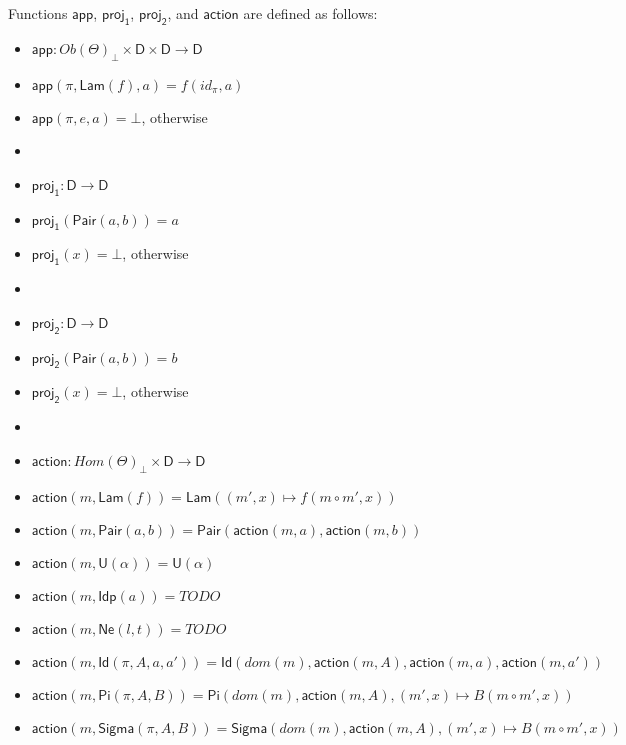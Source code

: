 \documentclass{amsart}
\theoremstyle{definition}
\theoremstyle{remark}
\newcommand{\D}{\mathsf{D}}
\numberwithin{table}{section}
\begin{document}
Functions $\mathsf{app}$, $\mathsf{proj_1}$, $\mathsf{proj_2}$, and $\mathsf{action}$ are defined as follows:
\begin{itemize}
\item[] $\mathsf{app} : Ob(\Theta)_\bot \times \D \times \D \to \D$
\item[] $\mathsf{app}(\pi,\mathsf{Lam}(f),a) = f(id_\pi,a)$
\item[] $\mathsf{app}(\pi,e,a) = \bot$, otherwise
\item[]
\item[] $\mathsf{proj_1} : \D \to \D$
\item[] $\mathsf{proj_1}(\mathsf{Pair}(a,b)) = a$
\item[] $\mathsf{proj_1}(x) = \bot$, otherwise
\item[]
\item[] $\mathsf{proj_2} : \D \to \D$
\item[] $\mathsf{proj_2}(\mathsf{Pair}(a,b)) = b$
\item[] $\mathsf{proj_2}(x) = \bot$, otherwise
\item[]
\item[] $\mathsf{action} : Hom(\Theta)_\bot \times \D \to \D$
\item[] $\mathsf{action}(m, \mathsf{Lam}(f)) = \mathsf{Lam}((m',x) \mapsto f(m \circ m', x))$
\item[] $\mathsf{action}(m, \mathsf{Pair}(a, b)) = \mathsf{Pair}(\mathsf{action}(m, a), \mathsf{action}(m, b))$
\item[] $\mathsf{action}(m, \mathsf{U}(\alpha)) = \mathsf{U}(\alpha)$
\item[] $\mathsf{action}(m, \mathsf{Idp}(a)) = TODO$
\item[] $\mathsf{action}(m, \mathsf{Ne}(l, t)) = TODO$
\item[] $\mathsf{action}(m, \mathsf{Id}(\pi, A, a, a')) = \mathsf{Id}(dom(m), \mathsf{action}(m, A), \mathsf{action}(m, a), \mathsf{action}(m, a'))$
\item[] $\mathsf{action}(m, \mathsf{Pi}(\pi, A, B)) = \mathsf{Pi}(dom(m), \mathsf{action}(m, A), (m', x) \mapsto B(m \circ m', x))$
\item[] $\mathsf{action}(m, \mathsf{Sigma}(\pi, A, B)) = \mathsf{Sigma}(dom(m), \mathsf{action}(m, A), (m', x) \mapsto B(m \circ m', x))$
\end{itemize}
\end{document}
